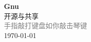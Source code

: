 \vspace*{\fill}
\begin{center}
    \textcolor{orange!50}{\Huge\textbf{Gnu}} \\[1em]
    \textcolor{orange!60!pink}{\Large 开源与共享} \\[2em]
    \textcolor{gray}{\large 手指敲打键盘如你敲击琴键} \\[1em]
    \today
\end{center}
\vspace*{\fill}
\clearpage


\clearpage

\clearpage


